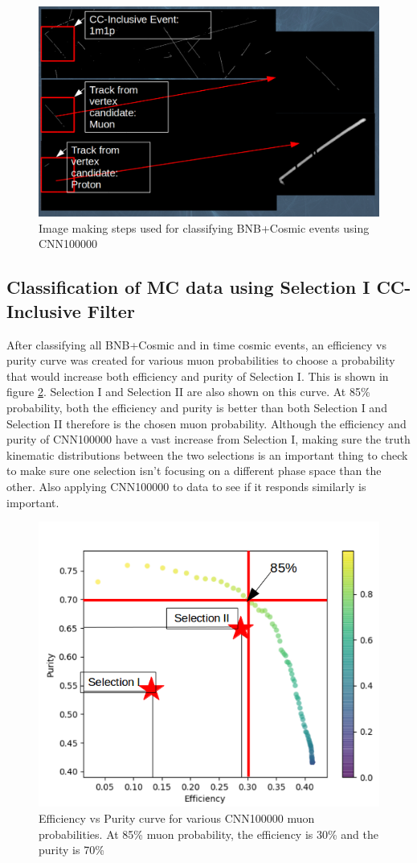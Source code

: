 \begin{figure}[htp!]
\centering
\includegraphics[width=\textwidth]{figs/cnn100000_image.png}
\caption{Image making steps used for classifying BNB+Cosmic events using CNN100000} 
\label{fig:cnn100000_image}
\end{figure}

\subsection{Classification of MC data using Selection I CC-Inclusive Filter}
After classifying all BNB+Cosmic and in time cosmic events, an efficiency vs purity curve was created for various muon probabilities to choose a probability that would increase both efficiency and purity of Selection I. This is shown in figure \ref{fig:roc}. Selection I and Selection II are also shown on this curve. At 85\% probability, both the efficiency and purity is better than both Selection I and Selection II therefore is the chosen muon probability. Although the efficiency and purity of CNN100000 have a vast increase from Selection I, making sure the truth kinematic distributions between the two selections is an important thing to check to make sure one selection isn't focusing on a different phase space than the other. Also applying CNN100000 to data to see if it responds similarly is important. 

\begin{figure}[htp!]
\centering
\includegraphics[width=.5\textwidth]{figs/roc_cnn_selI&II.png}
\caption{Efficiency vs Purity curve for various CNN100000 muon probabilities. At 85\% muon probability, the efficiency is 30\% and the purity is 70\%} 
\label{fig:roc}
\end{figure}

